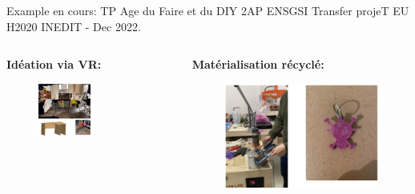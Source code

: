 \documentclass[
  11pt,
  ignorenonframetext,
  aspectratio=169,
  c]{beamer}
\begin{document}
\begin{frame}{Example en cours: TP Age du Faire et du DIY \hfill 2AP
ENSGSI}
\protect\hypertarget{example-en-cours-tp-age-du-faire-et-du-diy-2ap-ensgsi}{}
Transfer projeT EU H2020 INEDIT - Dec 2022.

\begin{columns}[T]
\begin{column}{0.6\textwidth}
\textbf{Idéation via VR:}

\begin{figure}

{\centering \includegraphics[width=0.5\textwidth,height=\textheight]{Figures/slides/Age-faire.jpg}

}

\end{figure}
\end{column}

\begin{column}{0.4\textwidth}
\textbf{Matérialisation récyclé:}

\begin{figure}

{\centering \includegraphics[width=1\textwidth,height=\textheight]{Figures/slides/Age-faire-1.png}

}

\end{figure}
\end{column}
\end{columns}
\end{frame}
\end{document}
